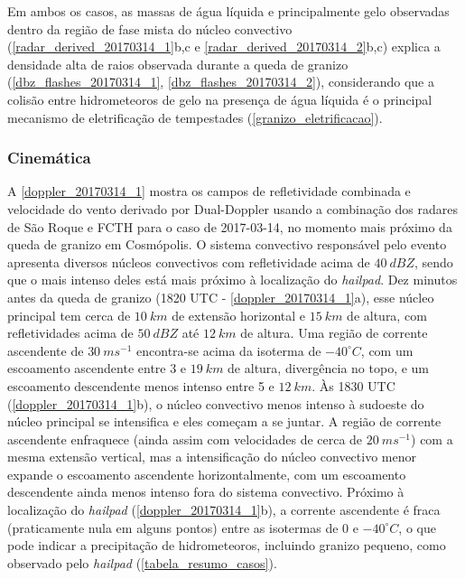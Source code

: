 Em ambos os casos, as massas de água líquida e principalmente gelo observadas dentro da região de fase mista do núcleo convectivo (\autoref{radar_derived_20170314_1}b,c e \autoref{radar_derived_20170314_2}b,c) explica a densidade alta de raios observada durante a queda de granizo (\autoref{dbz_flashes_20170314_1}, \autoref{dbz_flashes_20170314_2}), considerando que a colisão entre hidrometeoros de gelo na presença de água líquida é o principal mecanismo de eletrificação de tempestades (\autoref{granizo_eletrificacao}).

\subsubsection{Cinemática}\label{cinematica_201703014}

A \autoref{doppler_20170314_1} mostra os campos de refletividade combinada e velocidade do vento derivado por Dual-Doppler usando a combinação dos radares de São Roque e FCTH para o caso de 2017-03-14, no momento mais próximo da queda de granizo em Cosmópolis. O sistema convectivo responsável pelo evento apresenta diversos núcleos convectivos com refletividade acima de $40\:dBZ$, sendo que o mais intenso deles está mais próximo à localização do \textit{hailpad}. Dez minutos antes da queda de granizo (1820 UTC - \autoref{doppler_20170314_1}a), esse núcleo principal tem cerca de $10\:km$ de extensão horizontal e $15\:km$ de altura, com refletividades acima de $50\:dBZ$ até $12\:km$ de altura. Uma região de corrente ascendente de $30\:ms^{-1}$ encontra-se acima da isoterma de $-40^{\circ}C$, com um escoamento ascendente entre 3 e $19\:km$ de altura, divergência no topo, e um escoamento descendente menos intenso entre 5 e $12\:km$. Às 1830 UTC (\autoref{doppler_20170314_1}b), o núcleo convectivo menos intenso à sudoeste do núcleo principal se intensifica e eles começam a se juntar. A região de corrente ascendente enfraquece (ainda assim com velocidades de cerca de $20\:ms^{-1}$) com a mesma extensão vertical, mas a intensificação do núcleo convectivo menor expande o escoamento ascendente horizontalmente, com um escoamento descendente ainda menos intenso fora do sistema convectivo. Próximo à localização do \textit{hailpad} (\autoref{doppler_20170314_1}b), a corrente ascendente é fraca (praticamente nula em alguns pontos) entre as isotermas de 0 e $-40^{\circ}C$, o que pode indicar a precipitação de hidrometeoros, incluindo granizo pequeno, como observado pelo \textit{hailpad} (\autoref{tabela_resumo_casos}).


